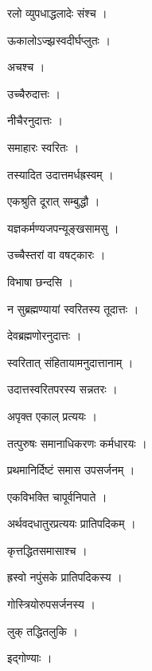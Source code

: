\documentclass[10pt, openany]{book}
\begin{document}
\noindent रलो व्युपधाद्धलादेः संश्च ।

\noindent ऊकालोऽज्झ्रस्वदीर्घप्लुतः ।

\noindent अचश्च ।

\noindent उच्चैरुदात्तः ।

\noindent नीचैरनुदात्तः ।

\noindent समाहारः स्वरितः ।

\noindent तस्यादित उदात्तमर्धह्रस्वम् ।

\noindent एकश्रुति दूरात् सम्बुद्धौ ।

\noindent यज्ञकर्मण्यजपन्यूङ्खसामसु ।

\noindent उच्चैस्तरां वा वषट्कारः ।

\noindent विभाषा छन्दसि ।

\noindent न सुब्रह्मण्यायां स्वरितस्य तूदात्तः ।

\noindent देवब्रह्मणोरनुदात्तः ।

\noindent स्वरितात् संहितायामनुदात्तानाम् ।

\noindent उदात्तस्वरितपरस्य सन्नतरः ।

\noindent अपृक्त एकाल् प्रत्ययः ।

\noindent तत्पुरुषः समानाधिकरणः कर्मधारयः ।

\noindent प्रथमानिर्दिष्टं समास उपसर्जनम् ।

\noindent एकविभक्ति चापूर्वनिपाते ।

\noindent अर्थवदधातुरप्रत्ययः प्रातिपदिकम् ।

\noindent कृत्तद्धितसमासाश्च ।

\noindent ह्रस्वो नपुंसके प्रातिपदिकस्य ।

\noindent गोस्त्रियोरुपसर्जनस्य ।

\noindent लुक् तद्धितलुकि ।

\noindent इद्गोण्याः ।
\end{document}
